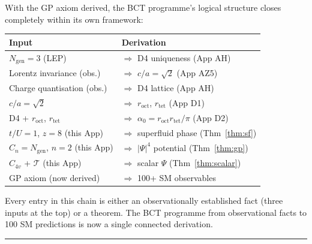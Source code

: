 \documentclass[11pt,a4paper]{article}
\theoremstyle{bctthm}
\theoremstyle{definition}
\begin{document}
With the GP axiom derived, the BCT programme's logical structure
closes completely within its own framework:

\begin{center}
\renewcommand{\arraystretch}{1.45}
\begin{tabular}{ll}
\toprule
Input & Derivation \\
\midrule
$N_\mathrm{gen} = 3$ (LEP) & $\Rightarrow$ D4 uniqueness (App AH) \\
Lorentz invariance (obs.) & $\Rightarrow$ $c/a = \sqrt{2}$ (App AZ5) \\
Charge quantisation (obs.) & $\Rightarrow$ D4 lattice (App AH) \\
$c/a = \sqrt{2}$ & $\Rightarrow$ $r_\mathrm{oct}$, $r_\mathrm{tet}$ (App D1) \\
D4 + $r_\mathrm{oct}$, $r_\mathrm{tet}$ & $\Rightarrow$ $\alpha_0 = r_\mathrm{oct}r_\mathrm{tet}/\pi$ (App D2) \\
$t/U = 1$, $z=8$ (this App) & $\Rightarrow$ superfluid phase (Thm~\ref{thm:sf}) \\
$C_n = N_\mathrm{gen}$, $n=2$ (this App) & $\Rightarrow$ $|\Psi|^4$ potential (Thm~\ref{thm:gp}) \\
$C_{4v}$ + $\mathcal{T}$ (this App) & $\Rightarrow$ scalar $\Psi$ (Thm~\ref{thm:scalar}) \\
GP axiom (now derived) & $\Rightarrow$ 100+ SM observables \\
\bottomrule
\end{tabular}
\end{center}

Every entry in this chain is either an observationally established
fact (three inputs at the top) or a theorem. The BCT programme
from observational facts to 100 SM predictions is now a single
connected derivation.

\noindent\rule{\textwidth}{0.6pt}
\end{document}
